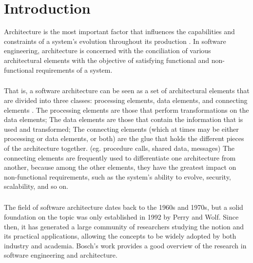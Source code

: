 
%

\chapter{Introduction}
\label{cha:introduction}

Architecture is the most important factor that influences the capabilities and constraints of a system's evolution throughout its production \cite{1}.
In software engineering, architecture is concerned with the conciliation of various architectural elements with the objective of satisfying functional and non-functional requirements of a system.

\paragraph{}

That is, a software architecture can be seen as a set of architectural elements that are divided into three classes: processing elements, data elements, and connecting elements \cite{2}.
The processing elements are those that perform transformations on the data elements;
The data elements are those that contain the information that is used and transformed;
The connecting elements (which at times may be either processing or data elements, or both) are the glue that holds the different pieces of the architecture together.
(eg. procedure calls, shared data, messages)
The connecting elements are frequently used to differentiate one architecture from another,
because among the other elements, they have the greatest impact on non-functional requirements, such as the system's ability to evolve, security, scalability, and so on.

\paragraph{}

The field of software architecture dates back to the 1960s and 1970s, but a solid foundation on the topic was only established in 1992 by Perry and Wolf.
Since then, it has generated a large community of researchers studying the notion and its practical applications,
allowing the concepts to be widely adopted by both industry and academia.
Bosch's work \cite{3, 4} provides a good overview of the research in software engineering and architecture.


